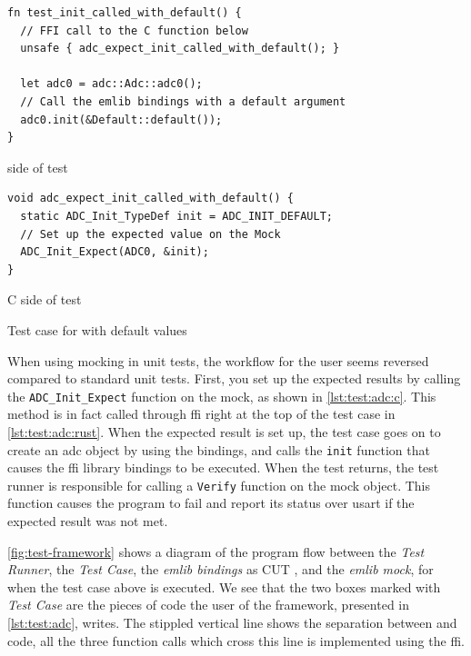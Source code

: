 \begin{listing}[H]
  \centering
  \begin{minipage}{\textwidth}
  \begin{listing}
    \begin{verbatim}
fn test_init_called_with_default() {
  // FFI call to the C function below
  unsafe { adc_expect_init_called_with_default(); }

  let adc0 = adc::Adc::adc0();
  // Call the emlib bindings with a default argument
  adc0.init(&Default::default());
}
    \end{verbatim}
    \caption{{\rust} side of  test}
    \label{lst:test:adc:rust}
  \end{listing}
  \end{minipage}

  \begin{minipage}{\textwidth}
  \begin{listing}
    \begin{verbatim}
void adc_expect_init_called_with_default() {
  static ADC_Init_TypeDef init = ADC_INIT_DEFAULT;
  // Set up the expected value on the Mock
  ADC_Init_Expect(ADC0, &init);
}
    \end{verbatim}
    \caption{C side of  test}
    \label{lst:test:adc:c}
  \end{listing}
  \end{minipage}

  \caption{Test case for  with default values}
  \label{lst:test:adc}
\end{listing}

When using mocking in unit tests, the workflow for the user seems reversed compared to standard unit tests.
First, you set up the expected results by calling the \texttt{ADC\_Init\_Expect} function on the mock, as shown in \autoref{lst:test:adc:c}.
This method is in fact called through \gls{ffi} right at the top of the test case in \autoref{lst:test:adc:rust}.
When the expected result is set up, the test case goes on to create an \gls{adc} object by using the {\rust} bindings, and calls the \texttt{init} function that causes the \gls{ffi} library bindings to be executed.
When the test returns, the test runner is responsible for calling a \texttt{Verify} function on the mock object.
This function causes the program to fail and report its status over \gls{usart} if the expected result was not met.

\autoref{fig:test-framework} shows a diagram of the program flow between the \textit{Test Runner}, the \textit{Test Case}, the \textit{emlib bindings} as \gls{CUT} , and the \textit{emlib mock}, for when the test case above is executed.
We see that the two boxes marked with \textit{Test Case} are the pieces of code the user of the framework, presented in \autoref{lst:test:adc}, writes.
The stippled vertical line shows the separation between {\rust} and {\C} code, all the three function calls which cross this line is implemented using the {\rust} \gls{ffi}.

